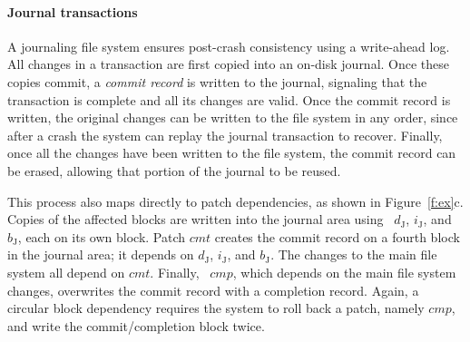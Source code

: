 \paragraph{Journal transactions}
%
A journaling file system ensures post-crash consistency using
 a write-ahead log.
%
%
All changes in a transaction are first copied into an on-disk journal.
%
Once these copies commit, a \emph{commit record} is written
 to the journal, signaling that the transaction is complete and all
 its changes are valid.
%
Once the commit record is written, the original changes can be written to the
file system in any order, since after a crash the system can replay the
 journal transaction to recover.
%
Finally, once all the changes have been written to the file system, the commit
record can be erased, allowing that portion of the journal to be reused.

\begin{comment}
\begin{figure}[htb]
  \centering
  \texttt{[image: fig/examplesb\_2]}
  \caption{\label{fig:journal} An example journal transaction using \patches.}
\end{figure}
\end{comment}

\def\PXcmt{\textit{cmt}}
\def\PXcmp{\textit{cmp}}

This process also maps directly to patch dependencies, as shown in
 Figure~\ref{f:ex}c.
%
Copies of the affected blocks are written into the journal area using
 \patches\ $d_\textrm{J}$, $i_\textrm{J}$, and $b_\textrm{J}$, each on its
 own block.
%
Patch $\PXcmt$ creates the commit record on a fourth block in the journal
 area; it depends on $d_\textrm{J}$,
$i_\textrm{J}$, and $b_\textrm{J}$.
%
The changes to the main file system all depend on $\PXcmt$.
%
Finally, \patch\ $\PXcmp$, which depends on the main file system changes,
 overwrites the commit record with a completion record.
%
Again, a circular block dependency requires the system to roll back a
 patch, namely $\PXcmp$, and write the commit/completion block twice.

\begin{comment}
This arrangement of dependencies ensures that the commit record is not written
to disk until all the journal data is present there, that the updates to the
file system itself are not written until the commit record is present on disk,
and that the completion record is not written until the entire transaction is
complete.

This example also contains an instance of a \patch\ which will need to be
reverted: $cmp$, which overwrites the commit record written by $cmt$ (and
thus $\PBlock{cmp} = \PBlock{cmt}$), cannot be written with $cmt$ since
$cmp \PDDepend \{b$, $i$, $i'$, $d\} \PDDepend cmt$.
%
So, we must revert $cmp$ and write $\PBlock{cmp}$ with only $cmt$ applied,
then write $b$, $i$, $i'$, and $d$, and finally write $\PBlock{cmp}$
again in order to write $cmp$.
\end{comment}



